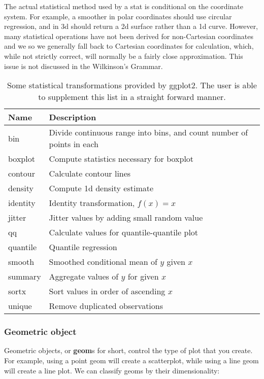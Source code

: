 The actual statistical method used by a stat is conditional on the coordinate system.  For example, a smoother in polar coordinates should use circular regression, and in 3d should return a 2d surface rather than a 1d curve.  However, many statistical operations have not been derived for non-Cartesian coordinates and we so we generally fall back to Cartesian coordinates for calculation, which, while not strictly correct, will normally be a fairly close approximation.  This issue is not discussed in the Wilkinson's Grammar.

\begin{table}
	\begin{center}
	\begin{tabular}{l|l}
	Name & Description \\
	\hline
	bin & Divide continuous range into bins, and count number of points in each\\ 
	boxplot & Compute statistics necessary for boxplot\\
	contour & Calculate contour lines\\
	density & Compute 1d density estimate \\
	identity & Identity transformation, $f(x) = x$ \\
	jitter & Jitter values by adding small random value \\
	qq & Calculate values for quantile-quantile plot \\
	quantile & Quantile regression\\
	smooth & Smoothed conditional mean of $y$ given $x$ \\
	summary & Aggregate values of $y$ for given $x$ \\
	sortx & Sort values in order of ascending $x$\\
	unique & Remove duplicated observations\\
	\end{tabular}
	\end{center}
	\caption{Some statistical transformations provided by ggplot2.  The user is able to supplement this list in a straight forward manner.}
	\label{tbl:statistics}
\end{table}

\subsubsection{Geometric object}\label{sub:geometric-objects} 

Geometric objects, or {\bf geom}s for short, control the type of plot that you create.  For example, using a point geom will create a scatterplot, while using a line geom will create a line plot.  We can classify geoms by their dimensionality:

